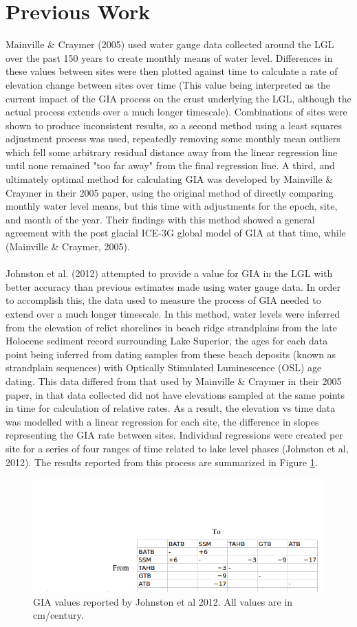 \section{Previous Work} 
Mainville \& Craymer (2005) used water gauge data collected around the LGL over the past 150 years to
 create monthly means of water level. Differences in these values between sites
 were then plotted against time to calculate a rate of elevation change between
 sites over time (This value being interpreted as the current impact of the GIA
 process on the crust underlying the LGL, although the actual process extends
 over a much longer timescale). Combinations of sites were shown to produce
 inconsistent results, so a second method using a least squares adjustment process was used,
 repeatedly removing some monthly mean outliers which fell some arbitrary residual distance away 
 from the linear regression line until none remained "too far away" from
 the final regression line. A third, and ultimately optimal method for calculating
 GIA was developed by
 Mainville \& Craymer in their 2005 paper, using the original
 method of directly comparing monthly
 water level means, but this time with adjustments for the epoch, site, and month of the year.
 Their findings with this method showed a general agreement with the post glacial
 ICE-3G global model of GIA at that time, while (Mainville \& Craymer, 2005).\\ \\
Johnston et al. (2012) attempted to provide a value for GIA in the LGL with
 better accuracy than previous estimates made using water
 gauge data. In order to accomplish this, the data used to measure the process of
 GIA needed to extend over a much longer timescale. In this method, water
 levels were inferred from the elevation of relict shorelines in beach ridge
 strandplains from the late Holocene sediment record surrounding Lake Superior,
 the ages for each data point being inferred from
 dating samples from these beach deposits (known as strandplain sequences) with
 Optically Stimulated Luminescence (OSL) age dating. This data differed from
 that used by Mainville \& Craymer in their 2005 paper, in that data collected did not have
 elevations sampled at the same points in time for calculation of relative
 rates. As a result, the elevation vs time data was modelled with a linear
 regression for each site, the difference in slopes representing the GIA rate
 between sites. Individual regressions were created per site
 for a series of four ranges of time related to lake level phases (Johnston et al, 2012). The results reported from this process
 are summarized in Figure \ref{fig:jj2012Grid}. \\
 
 \begin{figure}[t]
	\includegraphics[width=0.9\linewidth]{jjGrid.png}
	\caption{GIA values reported by Johnston et al 2012. All values are in cm/century.}
	\label{fig:jj2012Grid}
 \end{figure}
 
